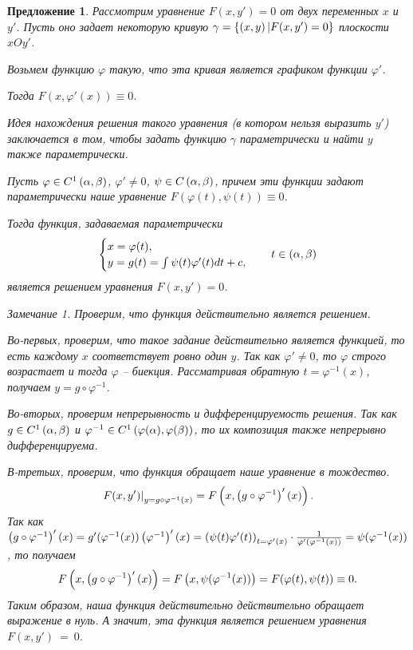 \documentclass[a5paper, 10pt]{article}
\theoremstyle{definition}
\theoremstyle{plain}
\newtheorem*{Prop}{Предложение}
\theoremstyle{remark}
\newtheorem*{Note}{Замечание}
\begin{document}
	\begin{Prop}
		Рассмотрим уравнение $F(x,y') = 0$ от двух переменных $x$ и $y'$. Пусть оно задает некоторую кривую $\gamma = \left\{\left(x,y\right) | F(x,y') = 0\right\}$ плоскости $xOy'$.
		
		Возьмем функцию $\varphi$ такую, что эта кривая является графиком функции $\varphi'$. 
		
		Тогда $F(x, \varphi'(x)) \equiv 0$. 
		
		Идея нахождения решения такого уравнения (в котором нельзя выразить $y'$) заключается в том, чтобы задать функцию $\gamma$ параметрически и найти $y$ также параметрически.
		
		Пусть $\varphi \in C^1\left(\alpha,\beta\right)$, $\varphi' \neq 0$, $\psi\in C\left(\alpha, \beta\right)$, причем эти функции задают параметрически наше уравнение $F(\varphi(t), \psi(t)) \equiv 0$.
		
		Тогда функция, задаваемая параметрически 
		\[
		\begin{cases}
			x = \varphi(t),\\
			y = g(t) = \int \psi(t)\varphi'(t)dt + c,
		\end{cases}
		\quad t \in \left(\alpha, \beta\right)
		\]
		является решением уравнения $F(x, y')=0$.
		
		\begin{Note}
			Проверим, что функция действительно является решением.
			
			Во-первых, проверим, что такое задание действительно является функцией, то есть каждому $x$ соответствует ровно один $y$. Так как $\varphi'\neq 0$, то $\varphi$ строго возрастает и тогда $\varphi$ -- биекция. Рассматривая обратную $t=\varphi^{-1} (x)$, получаем $y=g \circ \varphi^{-1}$.  
			
			Во-вторых, проверим непрерывность и дифференцируемость решения. Так как $g \in C^{1}\left(\alpha, \beta\right)$ и $\varphi^{-1} \in C^{1}\left(\varphi(\alpha),\varphi(\beta)\right)$, то их композиция также непрерывно дифференцируема.
			
			В-третьих, проверим, что функция обращает наше уравнение в тождество.
			\[
			\left. F(x,y') \right|_{y=g\circ\varphi^{-1}(x)} = F\left(x, \left(g\circ \varphi^{-1}\right)'(x)\right).
			\]
			Так как $\left(g\circ \varphi^{-1}\right)'(x) = g'(\varphi^{-1}(x))\left(\varphi^{-1}\right)'(x) = \left(\psi(t)\varphi'(t)\right)_{t=\varphi'(x)} \cdot \frac{1}{\varphi'\left(\varphi^{-1}(x)\right)} = \psi(\varphi^{-1}(x))$, то получаем
			\[
			F\left(x, \left(g\circ \varphi^{-1}\right)'(x)\right) = F\left(x, \psi(\varphi^{-1}(x))\right) = F(\varphi(t), \psi(t)) \equiv 0.
			\]
			Таким образом, наша функция действительно действительно обращает выражение в нуль. А значит, эта функция является решением уравнения $F(x,y')~=~0$.
		\end{Note}
	\end{Prop}
\end{document}
